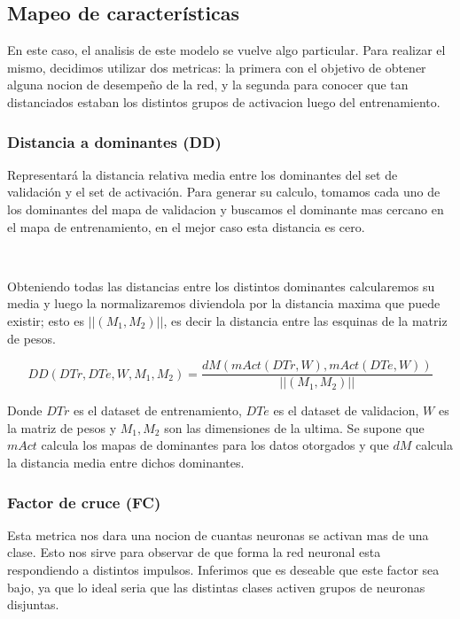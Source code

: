 \documentclass[informe.tex]{subfiles}
\begin{document}
      
     \FloatBarrier
    \subsection{Mapeo de características}
    
      En este caso, el analisis de este modelo se vuelve algo particular. Para realizar el mismo, decidimos utilizar dos metricas: la primera con el objetivo de obtener alguna nocion de desempe\~no de la red, y la segunda para conocer que tan distanciados estaban los distintos grupos de activacion luego del entrenamiento.
      
      \subsubsection{Distancia a dominantes (DD)}
      
      Representar\'a la distancia relativa media entre los dominantes del set de validaci\'on y el set de activaci\'on. Para generar su calculo, tomamos cada uno de los dominantes del mapa de validacion y buscamos el dominante mas cercano en el mapa de entrenamiento, en el mejor caso esta distancia es cero. 
      
      ~
      
      Obteniendo todas las distancias entre los distintos dominantes calcularemos su media y luego la normalizaremos diviendola por la distancia maxima que puede existir; esto es $||(M_1,M_2)||$, es decir la distancia entre las esquinas de la matriz de pesos.
      
      $$DD(DTr, DTe, W, M_1, M_2) = \frac{dM(mAct(DTr,W), mAct(DTe,W))}{||(M_1,M_2)||}$$
      
      Donde $DTr$ es el dataset de entrenamiento, $DTe$ es el dataset de validacion, $W$ es la matriz de pesos y $M_1, M_2$  son las dimensiones de la ultima. Se supone que $mAct$ calcula los mapas de dominantes para los datos otorgados y que $dM$ calcula la distancia media entre dichos dominantes.
      
      \subsubsection{Factor de cruce (FC)}
      
      Esta metrica nos dara una nocion de cuantas neuronas se activan mas de una clase. Esto nos sirve para observar de que forma la red neuronal esta respondiendo a distintos impulsos. Inferimos que es deseable que este factor sea bajo, ya que lo ideal seria que las distintas clases activen grupos de neuronas disjuntas.
      
\end{document}
